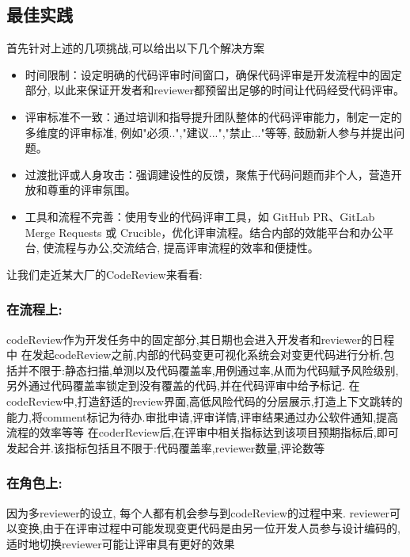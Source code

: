 \documentclass{article}
\begin{document}
\subsection{最佳实践}
首先针对上述的几项挑战,可以给出以下几个解决方案
\begin{itemize}
        \item 时间限制：设定明确的代码评审时间窗口，确保代码评审是开发流程中的固定部分, 以此来保证开发者和reviewer都预留出足够的时间让代码经受代码评审。
        \item 评审标准不一致：通过培训和指导提升团队整体的代码评审能力，制定一定的多维度的评审标准, 例如"必须..","建议...","禁止..."等等, 鼓励新人参与并提出问题。
        \item 过渡批评或人身攻击：强调建设性的反馈，聚焦于代码问题而非个人，营造开放和尊重的评审氛围。
        \item 工具和流程不完善：使用专业的代码评审工具，如 GitHub PR、GitLab Merge Requests 或 Crucible，优化评审流程。结合内部的效能平台和办公平台, 使流程与办公,交流结合, 提高评审流程的效率和便捷性。
\end{itemize}

让我们走近某大厂的CodeReview来看看:
\subsubsection{在流程上:}
codeReview作为开发任务中的固定部分,其日期也会进入开发者和reviewer的日程中\newline
在发起codeReview之前,内部的代码变更可视化系统会对变更代码进行分析,包括并不限于:静态扫描,单测以及代码覆盖率,用例通过率,从而为代码赋予风险级别,另外通过代码覆盖率锁定到没有覆盖的代码,并在代码评审中给予标记.\newline
在codeReview中,打造舒适的review界面,高低风险代码的分层展示,打造上下文跳转的能力,将comment标记为待办.审批申请,评审详情,评审结果通过办公软件通知,提高流程的效率等等\newline
在coderReview后,在评审中相关指标达到该项目预期指标后,即可发起合并.该指标包括且不限于:代码覆盖率,reviewer数量,评论数等\newline
\subsubsection{在角色上:}
因为多reviewer的设立, 每个人都有机会参与到codeReview的过程中来.\newline
reviewer可以变换,由于在评审过程中可能发现变更代码是由另一位开发人员参与设计编码的,适时地切换reviewer可能让评审具有更好的效果\newline
\end{document}

